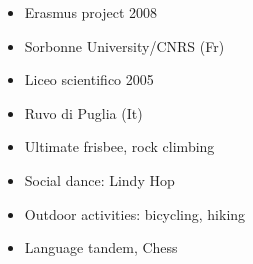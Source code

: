 \documentclass[10pt,a4paper,ragged2e,withhyper]{altacv}
\begin{document}
\begin{paracol}{2}
\begin{itemize}
\item Erasmus project \hfill 2008
\item[] Sorbonne University/CNRS (Fr)
\item Liceo scientifico \hfill 2005
\item[] Ruvo di Puglia (It) %

\end{itemize}


\begin{itemize}
\item Ultimate frisbee, rock climbing
\item Social dance: Lindy Hop
\item Outdoor activities: bicycling, hiking 
\item Language tandem, Chess
\end{itemize}

\end{paracol}
\end{document}
